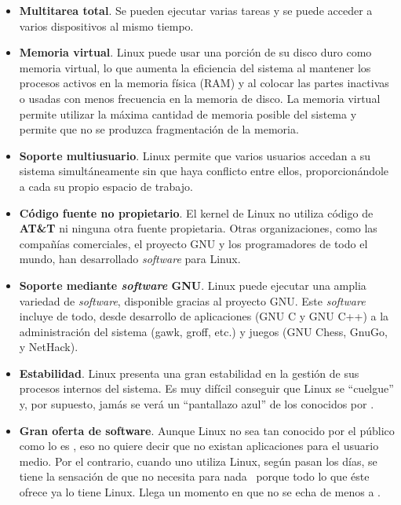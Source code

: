 \begin{itemize}

\item {\bf  Multitarea total}. Se  pueden ejecutar varias tareas  y se
puede acceder a varios dispositivos al mismo tiempo.

\item {\bf Memoria virtual}. Linux puede  usar una porción de su disco
duro como memoria virtual, lo que aumenta la eficiencia del sistema al
mantener los procesos activos en la  memoria física (RAM) y al colocar
las partes  inactivas o usadas con  menos frecuencia en la  memoria de
disco.  La memoria  virtual  permite utilizar  la  máxima cantidad  de
memoria posible del sistema y permite que no se produzca fragmentación
de la memoria.

\item {\bf  Soporte multiusuario}.  Linux permite que  varios usuarios
accedan  a su  sistema simultáneamente  sin que  haya conflicto  entre
ellos, proporcionándole a cada su propio espacio de trabajo.

\item  {\bf Código  fuente  no  propietario}. El  kernel  de Linux  no
utiliza  código de  {\bf AT\&T}  ni ninguna  otra fuente  propietaria.
Otras organizaciones, como las  compañías comerciales, el proyecto GNU
y los programadores de todo  el mundo, han desarrollado {\em software}
para Linux.

\item {\bf Soporte mediante {\em  software} GNU}. Linux puede ejecutar
una amplia  variedad de  {\em \mbox{software}}, disponible  gracias al
proyecto GNU. Este {\em software} incluye de todo, desde desarrollo de
aplicaciones (GNU C y GNU C++)  a la administración del sistema (gawk,
groff, etc.) y juegos (GNU Chess, GnuGo, y NetHack).

\item  {\bf  Estabilidad}.  Linux  presenta una  gran  estabilidad  en
la  gestión de  sus  procesos  internos del  sistema.  Es muy  difícil
conseguir que Linux  se ``cuelgue'' y, por supuesto, jamás  se verá un
``pantallazo azul'' de los conocidos por \windows.

\item {\bf Gran oferta de software}.  Aunque Linux no sea tan conocido
por el público como lo es \windows, eso no quiere decir que no existan
aplicaciones  para el  usuario  medio. Por  el  contrario, cuando  uno
utiliza Linux, según  pasan los días, se tiene la  sensación de que no
necesita para  nada \windows\  porque todo  lo que  éste ofrece  ya lo
tiene Linux. Llega un momento en que no se echa de menos a \windows.


\end{itemize}
